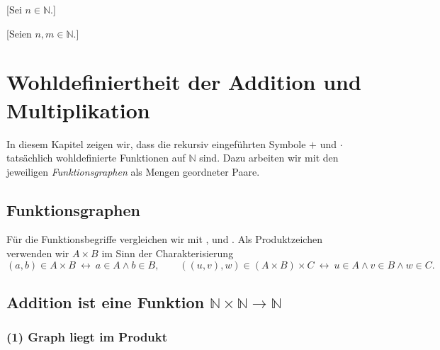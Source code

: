 \documentclass[main.tex]{subfiles}
\begin{document}
[Sei \(n \in \mathbb{N}\).]

[Seien \(n,m \in \mathbb{N}\).]

\chapter{Wohldefiniertheit der Addition und Multiplikation}

In diesem Kapitel zeigen wir, dass die rekursiv eingeführten Symbole \(+\) und \(\cdot\)
tatsächlich wohldefinierte Funktionen auf \(\mathbb{N}\) sind. Dazu arbeiten wir
mit den jeweiligen \emph{Funktionsgraphen} als Mengen geordneter Paare.

\section{Funktionsgraphen}



\begin{remark}
Für die Funktionsbegriffe vergleichen wir mit ,
 und
.
Als Produktzeichen verwenden wir \(A\times B\) im Sinn der Charakterisierung
\[
(a,b)\in A\times B \ \leftrightarrow\ a\in A \land b\in B,\qquad
((u,v),w)\in (A\times B)\times C \ \leftrightarrow\ u\in A \land v\in B \land w\in C.
\]
\end{remark}

\section{Addition ist eine Funktion \( \mathbb{N}\times\mathbb{N} \to \mathbb{N}\)}

\subsection*{(1) Graph liegt im Produkt}
\end{document}
